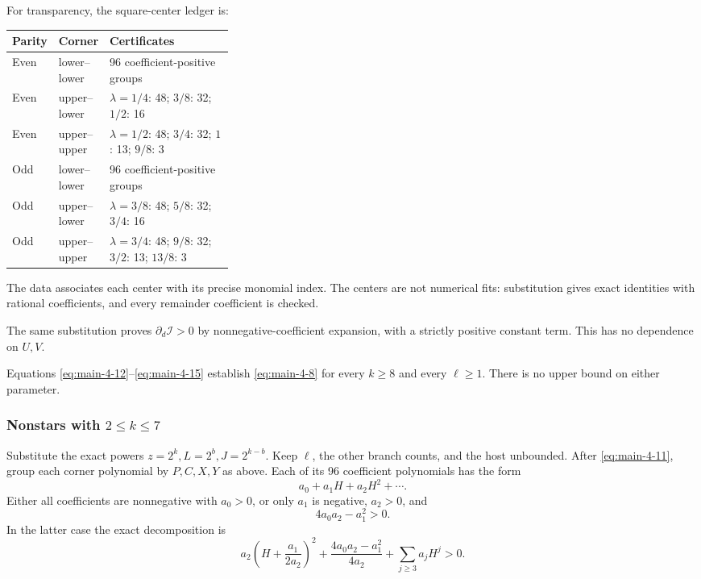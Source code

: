 \documentclass[11pt,reqno]{amsart}
\theoremstyle{plain}
\begin{document}
For transparency, the square-center ledger is:

\begin{center}
\begin{tabular}{@{}p{0.12\linewidth}p{0.20\linewidth}p{}@{}}
\toprule
\textbf{Parity} & \textbf{Corner} & \textbf{Certificates} \\
\midrule
Even & lower--lower & 96 coefficient-positive groups \\
Even & upper--lower & \(\lambda=1/4\): 48; \(3/8\): 32; \(1/2\): 16 \\
Even & upper--upper & \(\lambda=1/2\): 48; \(3/4\): 32; \(1\): 13; \(9/8\): 3 \\
Odd & lower--lower & 96 coefficient-positive groups \\
Odd & upper--lower & \(\lambda=3/8\): 48; \(5/8\): 32; \(3/4\): 16 \\
Odd & upper--upper & \(\lambda=3/4\): 48; \(9/8\): 32; \(3/2\): 13; \(13/8\): 3 \\
\bottomrule
\end{tabular}
\end{center}

The data associates each center with its precise monomial index. The centers are not numerical fits: substitution gives exact identities with rational coefficients, and every remainder coefficient is checked.

The same substitution proves \(\partial_d\mathcal I>0\) by nonnegative-coefficient expansion, with a strictly positive constant term. This has no dependence on \(U,V\).

Equations \eqref{eq:main-4-12}--\eqref{eq:main-4-15} establish \eqref{eq:main-4-8} for every \(k\ge8\) and every \(\ell\ge1\). There is no upper bound on either parameter.

\subsubsection*{\texorpdfstring{Nonstars with \(2\le k\le7\)}{Nonstars with 2 <= k <= 7}}\label{nonstars-with-2le-kle7}

Substitute the exact powers \(z=2^k,L=2^b,J=2^{k-b}\). Keep \(\ell\), the other branch counts, and the host unbounded. After \eqref{eq:main-4-11}, group each corner polynomial by \(P,C,X,Y\) as above. Each of its 96 coefficient polynomials has the form \[
a_0+a_1H+a_2H^2+\cdots.
\] Either all coefficients are nonnegative with \(a_0>0\), or only \(a_1\) is negative, \(a_2>0\), and \[
4a_0a_2-a_1^2>0.
\] In the latter case the exact decomposition is \[
a_2\left(H+\frac{a_1}{2a_2}\right)^2
+\frac{4a_0a_2-a_1^2}{4a_2}
+\sum_{j\ge3}a_jH^j>0.
\tag{4.17}\label{eq:main-4-17}
\]
\end{document}
